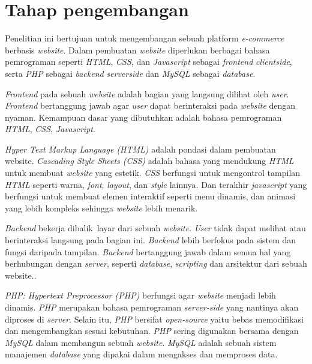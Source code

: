 \section{Tahap pengembangan}
Penelitian ini bertujuan untuk mengembangan sebuah platform \textit{e-commerce} berbasis \textit{website}. Dalam pembuatan \textit{website} diperlukan berbagai bahasa pemrograman seperti \textit{HTML}, \textit{CSS}, dan \textit{Javascript} sebagai \textit{frontend} \textit{clientside}, serta \textit{PHP} sebagai \textit{backend} \textit{serverside} dan \textit{MySQL} sebagai \textit{database}.
\par \textit{Frontend} pada sebuah \textit{website} adalah bagian yang langsung dilihat oleh \textit{user}. \textit{Frontend} bertanggung jawab agar \textit{user} dapat berinteraksi pada \textit{website} dengan nyaman. Kemampuan dasar yang dibutuhkan adalah bahasa pemrograman \textit{HTML}, \textit{CSS}, \textit{Javascript}.
\par \textit{Hyper Text Markup Language (HTML)} adalah pondasi dalam pembuatan website. \textit{Cascading Style Sheets (CSS)} adalah bahasa yang mendukung \textit{HTML} untuk membuat \textit{website} yang estetik. \textit{CSS} berfungsi untuk mengontrol tampilan \textit{HTML} seperti warna, \textit{font}, \textit{layout}, dan \textit{style} lainnya. Dan terakhir \textit{javascript} yang berfungsi untuk membuat elemen interaktif seperti menu dinamis, dan animasi yang lebih kompleks sehingga \textit{website} lebih menarik.
\par \textit{Backend} bekerja dibalik layar dari sebuah \textit{website}. \textit{User} tidak dapat melihat atau berinteraksi langsung pada bagian ini. \textit{Backend} lebih berfokus pada sistem dan fungsi daripada tampilan. \textit{Backend} bertanggung jawab dalam semua hal yang berhubungan dengan \textit{server}, seperti \textit{database}, \textit{scripting} dan arsitektur dari sebuah website.. 
\par \textit{PHP: Hypertext Preprocessor (PHP)} berfungsi agar \textit{website} menjadi lebih dinamis. \textit{PHP} merupakan bahasa pemrograman \textit{server-side} yang nantinya akan diproses di \textit{server}. Selain itu, \textit{PHP} bersifat \textit{open-source} yaitu bebas memodifikasi dan mengembangkan sesuai kebutuhan. \textit{PHP} sering digunakan bersama dengan \textit{MySQL} dalam membangun sebuah \textit{website}. \textit{MySQL} adalah sebuah sistem manajemen \textit{database} yang dipakai dalam mengakses dan memproses data. 